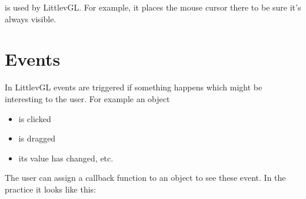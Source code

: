 \documentclass[letterpaper,10pt,english]{sphinxmanual}
\begin{document}
 is used by LittlevGL. For example, it places the mouse cursor there to be sure it’s always visible.


\section{Events}
\label{\detokenize{overview/events:events}}\label{\detokenize{overview/events::doc}}
In LittlevGL events are triggered if something happens which might be interesting to the user. For example an object
\begin{itemize}
\item {} 
is clicked

\item {} 
is dragged

\item {} 
its value has changed, etc.

\end{itemize}

The user can assign a callback function to an object to see these event. In the practice it looks like this:
\end{document}
